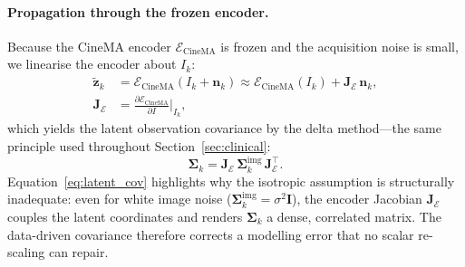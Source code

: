 \documentclass[10pt,twocolumn]{article}
\begin{document}
\paragraph{Propagation through the frozen encoder.}
Because the CineMA encoder $\mathcal{E}_{\text{CineMA}}$ is frozen and the acquisition noise is small, we linearise the encoder about $I_k$:
\begin{equation}
\begin{aligned}
    \tilde{\bm{z}}_k &= \mathcal{E}_{\text{CineMA}}(I_k + \bm{n}_k) \approx \mathcal{E}_{\text{CineMA}}(I_k) + \bm{J}_{\mathcal{E}}\, \bm{n}_k, \\
    \bm{J}_{\mathcal{E}} &= \frac{\partial \mathcal{E}_{\text{CineMA}}}{\partial I}\bigg|_{I_k},
\end{aligned}
\label{eq:enc_lin}
\end{equation}
which yields the latent observation covariance by the delta method---the same principle used throughout Section~\ref{sec:clinical}:
\begin{equation}
    \boxed{\ \bm{\Sigma}_k = \bm{J}_{\mathcal{E}}\, \bm{\Sigma}_k^{\text{img}}\, \bm{J}_{\mathcal{E}}^{\top}.\ }
    \label{eq:latent_cov}
\end{equation}
Equation~\eqref{eq:latent_cov} highlights why the isotropic assumption is structurally inadequate: even for white image noise ($\bm{\Sigma}_k^{\text{img}} = \sigma^2 \bm{I}$), the encoder Jacobian $\bm{J}_{\mathcal{E}}$ couples the latent coordinates and renders $\bm{\Sigma}_k$ a dense, correlated matrix. The data-driven covariance therefore corrects a modelling error that no scalar re-scaling can repair.
\end{document}
